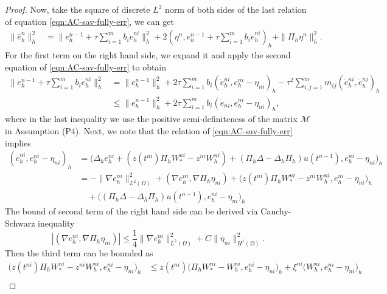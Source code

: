\documentclass[a4paper, oneside]{book}
\def\II{(\Omega)}
\begin{document}
\begin{proof}
Now, take the square of discrete $L^2$ norm of both sides
of the last relation of equation \eqref{eqn:AC-sav-fully-err},
we can get
\begin{equation}\label{eqn:split-0}
\begin{split}
\|\hat e_h^{n}\|_h^2 & = \|e_h^{n-1}+\tau\sum_{i=1}^{m} b_i\dot{e}_h^{ni}\|_h^2
+ 2(\eta^{n}, e_h^{n-1}+ \tau\sum_{i=1}^{m} b_i\dot{e}_h^{ni})_h + \|\Pi_h \eta^{n}\|_h^2.
\end{split}
\end{equation}
For the first term on the right hand side,
we expand it and apply the second equation of \eqref{eqn:AC-sav-fully-err}  to obtain
\begin{align*}
\|e_h^{n-1}+\tau\sum_{i=1}^{m} b_i\dot{e}_h^{ni}\|_h^2
&= \|e_h^{n-1}\|_h^2 + 2\tau\sum_{i=1}^{m}b_i(\dot{e}_h^{ni},e_h^{ni}-\eta_{ni})_h
- \tau^2\sum_{i,j=1}^{m}m_{ij}(\dot{e}_h^{ni}, \dot{e}_h^{nj})_h\\
&\leq \|e_h^{n-1}\|_h^2 + 2\tau\sum_{i=1}^{m}b_i(\dot{e}_{ni},e_h^{ni}-\eta_{ni})_h,
\end{align*}
where in the last inequality we use the positive semi-definiteness of the matrix $\mathcal{M}$ in Assumption (P4).
Next, we note that the relation of \eqref{eqn:AC-sav-fully-err} implies
\begin{equation*}
\begin{split}
(\dot{e}_h^{ni},e_h^{ni}-\eta_{ni})_h
&= \Big(   \Delta_h e_h^{ni} +  (z(t^{ni}) \Pi_h W_*^{ni} - z^{ni} W_h^{ni})
+ (\Pi_h \Delta - \Delta_h \Pi_h) u(t^{n-1}), e_h^{ni}-\eta_{ni} \Big)_h\\
&= -\|\nabla e_h^{ni}\|_{L^2\II}^2 + (\nabla e_h^{ni} , \nabla \Pi_h \eta_{ni})
+  \Big(z(t^{ni}) \Pi_h W_*^{ni} - z^{ni} W_h^{ni}, e_h^{ni}-\eta_{ni}\Big)_h  \\
& \quad +  \Big(  (\Pi_h \Delta - \Delta_h \Pi_h) u(t^{n-1}), e_h^{ni}-\eta_{ni}\Big)_h
\end{split}
\end{equation*}
The bound of second term of the right hand side can be derived via Cauchy-Schwarz inequality
\begin{equation*}
|(\nabla e_h^{ni} , \nabla \Pi_h \eta_{ni})| \le \frac14 \|  \nabla e_h^{ni} \|_{L^2\II}^2 + C \| \eta_{ni}\|_{H^1\II}^2.
\end{equation*}
Then the third term can be bounded as
\begin{equation*}
\begin{split}
  \Big(z(t^{ni}) \Pi_h W_*^{ni} - z^{ni} W_h^{ni}, e_h^{ni}-\eta_{ni} \Big)_h
 & \le z(t^{ni})  \Big( \Pi_h W_*^{ni} -  W_h^{ni}, e_h^{ni}-\eta_{ni} \Big)_h +  \xi^{ni} \Big( W_h^{ni}, e_h^{ni}-\eta_{ni} \Big)_h\\

\end{split}
\end{equation*}
\end{proof}
\end{document}
